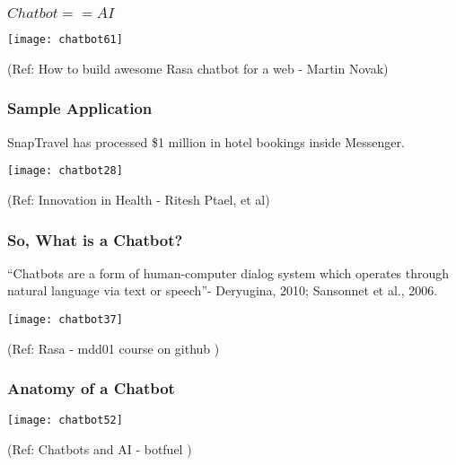 \begin{frame}[fragile]\frametitle{$Chatbot == AI$}


\begin{center}
\texttt{[image: chatbot61]}
\end{center}

{\tiny (Ref: How to build awesome Rasa chatbot for a web - Martin Novak)}


\end{frame}


\begin{frame}[fragile]\frametitle{Sample Application}

SnapTravel has processed \$1 million in hotel bookings inside Messenger.


\begin{center}
\texttt{[image: chatbot28]}
\end{center}

{\tiny (Ref: Innovation in Health - Ritesh Ptael, et al)}


\end{frame}



\begin{frame}[fragile]\frametitle{So, What is a Chatbot?}

``Chatbots are a form of human-computer dialog system which operates 
through natural language via text or speech''- Deryugina, 2010; Sansonnet et al., 2006.

\begin{center}
\texttt{[image: chatbot37]}

{\tiny (Ref: Rasa - mdd01 course on github )}

\end{center}

\end{frame}


\begin{frame}[fragile]\frametitle{Anatomy of a Chatbot}

\begin{center}
\texttt{[image: chatbot52]}

{\tiny (Ref: Chatbots and AI - botfuel )}

\end{center}

\end{frame}

